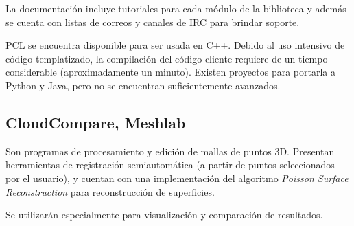 	La documentación incluye tutoriales para cada módulo de la biblioteca y
	además se cuenta con listas de correos y canales de IRC para brindar
	soporte.

	PCL se encuentra disponible para ser usada en C++.
	Debido al uso intensivo de código templatizado, la compilación del
	código cliente requiere de un tiempo considerable (aproximadamente un minuto).
	Existen proyectos para portarla a Python y Java, pero no se encuentran
	suficientemente avanzados.

	\subsection{CloudCompare, Meshlab}
	Son programas de procesamiento y edición de mallas de puntos 3D.  Presentan
	herramientas de registración semiautomática (a partir de puntos
	seleccionados por el usuario), y cuentan con una implementación del
	algoritmo \emph{Poisson Surface Reconstruction} para reconstrucción de
	superficies.

	Se utilizarán especialmente para visualización y comparación de resultados.


